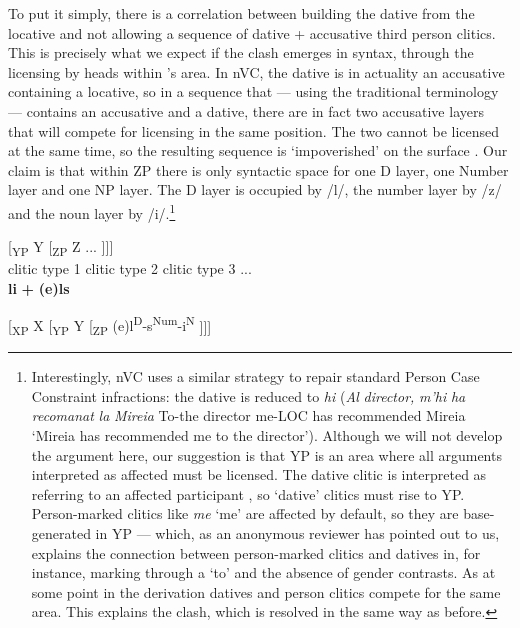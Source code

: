 \documentclass[output=paper,modfonts,nonflat,newtxmath,colorlinks,citecolor=brown]{langsci/langscibook}
\begin{document}
To put it simply, there is a correlation between building the dative from the locative and not allowing a sequence of dative + accusative third person clitics. This is precisely what we expect if the clash emerges in syntax, through the licensing by heads within \citeauthor{Sportiche1996}’s area. In nVC, the dative is in actuality an accusative containing a locative, so in a sequence that — using the traditional terminology — contains an accusative and a dative, there are in fact two accusative layers that will compete for licensing in the same position. The two cannot be licensed at the same time, so the resulting sequence is ‘impoverished’ on the surface . Our claim is that within ZP there is only syntactic space for one D layer, one Number layer and one NP layer. The D layer is occupied by /l/, the number layer by /z/ and the noun layer by /i/.\footnote{Interestingly, nVC uses a similar strategy to repair standard Person Case Constraint infractions: the dative is reduced to \textit{hi} (\textit{Al} \textit{director,} \textit{m’hi} \textit{ha} \textit{recomanat} \textit{la} \textit{Mireia} To-the director me-LOC has recommended Mireia ‘Mireia has recommended me to the director’). Although we will not develop the argument here, our suggestion is that YP is an area where all arguments interpreted as affected must be licensed. The dative clitic is interpreted as referring to an affected participant \citep{AdgerHarbour2007}, so ‘dative’ clitics must rise to YP. Person-marked clitics like \textit{me} ‘me’ are affected by default, so they are base{}-generated in YP — which, as an anonymous reviewer has pointed out to us, explains the connection between person-marked clitics and datives in, for instance, marking through a ‘to’ and the absence of gender contrasts. As at some point in the derivation datives and person clitics compete for the same area. This explains the clash, which is resolved in the same way as before.}  

\ea%
    \label{ex:cabre:16}
    \ea \label{ex:cabre:16a}
    \gll {[\textsubscript{XP} X} { } {[\textsubscript{YP} Y} { }  {[\textsubscript{ZP}  Z} ...  ]]]\\
    \footnotesize {clitic type 1} { } \footnotesize {clitic type 2} { } \footnotesize   {clitic type 3} ...\\
    \glt  *\textbf{li} \textbf{+} \textbf{(e)ls}
    
    \ex \label{ex:cabre:16b} {[\textsubscript{XP} X}  {[\textsubscript{YP} Y}  {[\textsubscript{ZP}  (e)l\textsuperscript{D}-s\textsuperscript{Num}-i\textsuperscript{N}} ]]]
    \z
   
\end{document}
